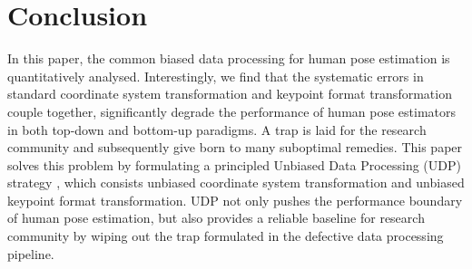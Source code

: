 \documentclass[10pt,journal,compsoc]{IEEEtran}
\begin{document}
\section{Conclusion}
In this paper, the common biased data processing for human pose estimation is quantitatively analysed. Interestingly, we find that the systematic errors in standard coordinate system transformation and keypoint format transformation couple together, significantly degrade the performance of human pose estimators in both top-down and bottom-up paradigms. A trap is laid for the research community and subsequently give born to many suboptimal remedies. This paper solves this problem by formulating a principled Unbiased Data Processing (UDP) strategy , which consists unbiased coordinate system transformation and unbiased keypoint format transformation. UDP not only pushes the performance boundary of human pose estimation, but also provides a reliable baseline for research community by wiping out the trap formulated in the defective data processing pipeline.










\ifCLASSOPTIONcaptionsoff
  \newpage
\fi









\end{document}
